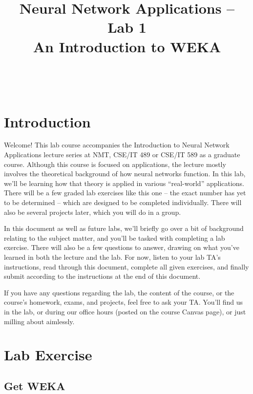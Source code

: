 \documentclass[11pt]{cselabheader}
\title{Neural Network Applications -- Lab 1 \\ An Introduction to WEKA}
\begin{document}
\maketitle

\horrule{0.5pt}\\\horrule{2pt}

\section{Introduction}

Welcome! This lab course accompanies the Introduction to Neural Network Applications lecture series at NMT, CSE/IT 489 or CSE/IT 589 as a graduate course. Although this course is focused on applications, the lecture mostly involves the theoretical background of how neural networks function. In this lab, we'll be learning how that theory is applied in various ``real-world'' applications. There will be a few graded lab exercises like this one -- the exact number has yet to be determined -- which are designed to be completed individually. There will also be several projects later, which you will do in a group.

In this document as well as future labs, we'll briefly go over a bit of background relating to the subject matter, and you'll be tasked with completing a lab exercise. There will also be a few questions to answer, drawing on what you've learned in both the lecture and the lab. For now, listen to your lab TA's instructions, read through this document, complete all given exercises, and finally submit according to the instructions at the end of this document.

If you have any questions regarding the lab, the content of the course, or the course's homework, exams, and projects, feel free to ask your TA. You'll find us in the lab, or during our office hours (posted on the course Canvas page), or just milling about aimlessly.

\pagebreak



\section{Lab Exercise}

\subsection{Get WEKA}
\end{document}
